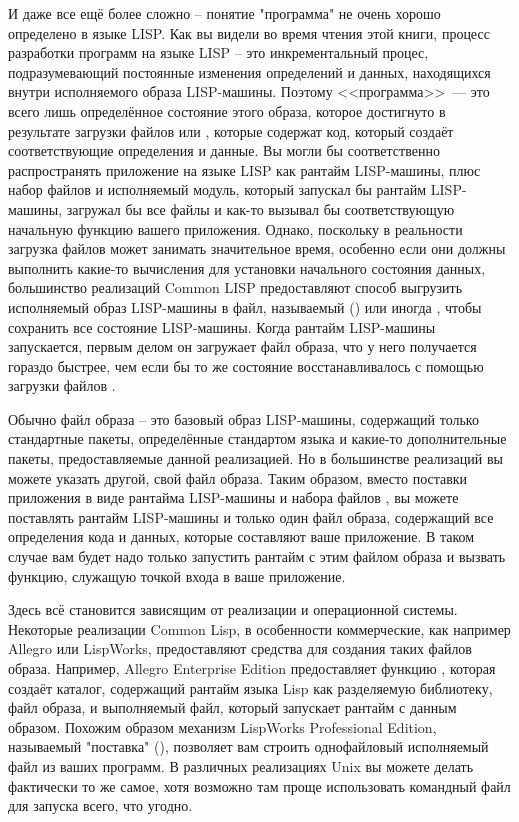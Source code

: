 И даже все ещё более сложно -- понятие "программа" не очень хорошо определено в языке
LISP. Как вы видели во время чтения этой книги, процесс разработки программ на языке LISP
-- это инкрементальный процес, подразумевающий постоянные изменения определений и данных,
находящихся внутри исполняемого образа LISP-машины. Поэтому <<программа>>~--- это всего
лишь определённое состояние этого образа, которое достигнуто в результате загрузки файлов
 или , которые содержат код, который создаёт соответствующие
определения и данные. Вы могли бы соответственно распространять приложение на языке LISP
как рантайм LISP-машины, плюс набор файлов  и исполняемый модуль, который
запускал бы рантайм LISP-машины, загружал бы все файлы  и как-то вызывал бы
соответствующую начальную функцию вашего приложения. Однако, поскольку в реальности
загрузка файлов  может занимать значительное время, особенно если они должны
выполнить какие-то вычисления для установки начального состояния данных, большинство
реализаций Common LISP предоставляют способ выгрузить исполняемый образ LISP-машины в
файл, называемый  () или иногда , чтобы
сохранить все состояние LISP-машины. Когда рантайм LISP-машины запускается, первым делом
он загружает файл образа, что у него получается гораздо быстрее, чем если бы то же
состояние восстанавливалось с помощью загрузки файлов .

Обычно файл образа -- это базовый образ LISP-машины, содержащий только стандартные пакеты,
определённые стандартом языка и какие-то дополнительные пакеты, предоставляемые данной
реализацией. Но в большинстве реализаций вы можете указать другой, свой файл образа. Таким
образом, вместо поставки приложения в виде рантайма LISP-машины и набора файлов
, вы можете поставлять рантайм LISP-машины и только один файл образа,
содержащий все определения кода и данных, которые составляют ваше приложение. В таком
случае вам будет надо только запустить рантайм с этим файлом образа и вызвать функцию,
служащую точкой входа в ваше приложение.

Здесь всё становится зависящим от реализации и операционной системы. Некоторые реализации
Common Lisp, в особенности коммерческие, как например Allegro или LispWorks, предоставляют
средства для создания таких файлов образа. Например, Allegro Enterprise Edition
предоставляет функцию , которая создаёт каталог,
содержащий рантайм языка Lisp как разделяемую библиотеку, файл образа, и выполняемый файл,
который запускает рантайм с данным образом. Похожим образом механизм LispWorks
Professional Edition, называемый "поставка" (), позволяет вам строить
однофайловый исполняемый файл из ваших программ. В различных реализациях Unix вы можете
делать фактически то же самое, хотя возможно там проще использовать командный файл для
запуска всего, что угодно.

